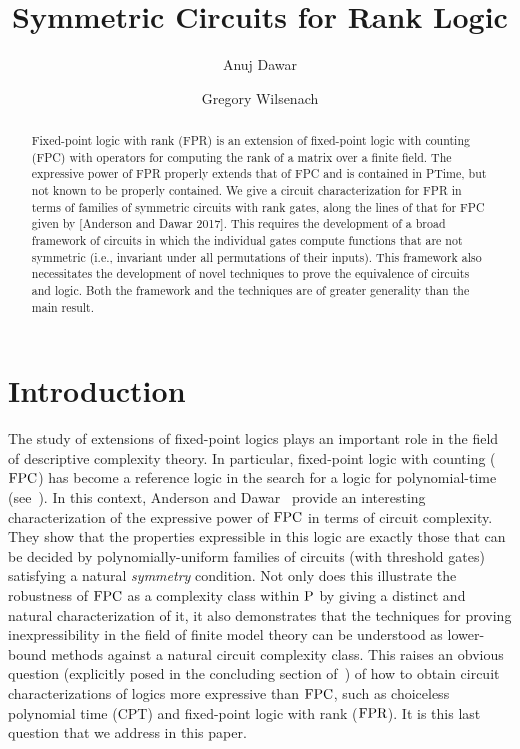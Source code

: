 \documentclass[a4paper,UKenglish]{lipics-v2018}
\title{Symmetric Circuits for Rank Logic}
\author{Anuj Dawar}{Department of Computer Science and Technology,
  University of Cambridge}{anuj.dawar@cl.cam.ac.uk}{0000-0003-4014-8248}{}%
\author{Gregory Wilsenach}{Department of Computer Science and
  Technology, University of Cambridge}{gregory.wilsenach@cl.cam.ac.uk}{}{Funding
  provided by the Gates Cambridge Scholarship}
\begin{document}
\maketitle

\begin{abstract}
  Fixed-point logic with rank (FPR) is an extension of fixed-point logic with
  counting (FPC) with operators for computing the rank of a matrix over a finite
  field. The expressive power of FPR properly extends that of FPC and is
  contained in PTime, but not known to be properly contained. We give a circuit
  characterization for FPR in terms of families of symmetric circuits with rank
  gates, along the lines of that for FPC given by [Anderson and Dawar 2017].
  This requires the development of a broad framework of circuits in which the
  individual gates compute functions that are not symmetric (i.e., invariant
  under all permutations of their inputs). This framework also
  necessitates the development of novel techniques to prove the
  equivalence of circuits and logic.  Both the framework and the
  techniques are of greater generality than the main result.
\end{abstract}

\section{Introduction}\label{sec:introduction}

The study of extensions of fixed-point logics plays an important role in the
field of descriptive complexity theory. In particular, fixed-point logic with
counting ($\text{\upshape FPC}$) has become a reference logic in the search for a logic for
polynomial-time (see~\cite{Dawar-siglog}). In this context, Anderson and
Dawar~\cite{AndersonD17} provide an interesting characterization of the
expressive power of $\text{\upshape FPC}$ in terms of circuit complexity. They show that the
properties expressible in this logic are exactly those that can be decided by
polynomially-uniform families of circuits (with threshold gates) satisfying a
natural \emph{symmetry} condition. Not only does this illustrate the robustness
of $\text{\upshape FPC}$ as a complexity class within $\mathrm{P}$ by giving a distinct and natural
characterization of it, it also demonstrates that the techniques for proving
inexpressibility in the field of finite model theory can be understood as
lower-bound methods against a natural circuit complexity class. This raises an
obvious question (explicitly posed in the concluding section
of~\cite{AndersonD17}) of how to obtain circuit characterizations of logics more
expressive than $\text{\upshape FPC}$, such as choiceless polynomial time (CPT) and fixed-point
logic with rank ($\text{\upshape FPR}$). It is this last question that we address in this
paper.
\end{document}
